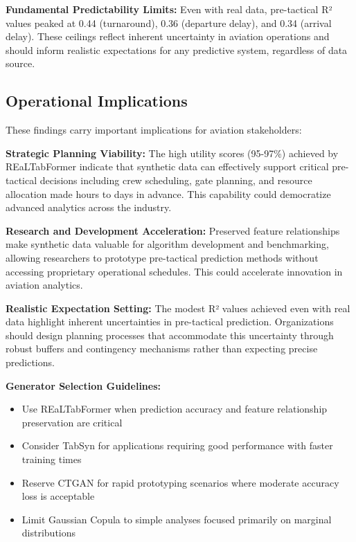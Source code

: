 \documentclass[conference]{IEEEtran}
\begin{document}
\textbf{Fundamental Predictability Limits:} Even with real data, pre-tactical R² values peaked at 0.44 (turnaround), 0.36 (departure delay), and 0.34 (arrival delay). These ceilings reflect inherent uncertainty in aviation operations and should inform realistic expectations for any predictive system, regardless of data source.

\subsection{Operational Implications}

These findings carry important implications for aviation stakeholders:

\textbf{Strategic Planning Viability:} The high utility scores (95-97\%) achieved by REaLTabFormer indicate that synthetic data can effectively support critical pre-tactical decisions including crew scheduling, gate planning, and resource allocation made hours to days in advance. This capability could democratize advanced analytics across the industry.

\textbf{Research and Development Acceleration:} Preserved feature relationships make synthetic data valuable for algorithm development and benchmarking, allowing researchers to prototype pre-tactical prediction methods without accessing proprietary operational schedules. This could accelerate innovation in aviation analytics.

\textbf{Realistic Expectation Setting:} The modest R² values achieved even with real data highlight inherent uncertainties in pre-tactical prediction. Organizations should design planning processes that accommodate this uncertainty through robust buffers and contingency mechanisms rather than expecting precise predictions.

\textbf{Generator Selection Guidelines:} 
\begin{itemize}
    \item Use REaLTabFormer when prediction accuracy and feature relationship preservation are critical
    \item Consider TabSyn for applications requiring good performance with faster training times
    \item Reserve CTGAN for rapid prototyping scenarios where moderate accuracy loss is acceptable
    \item Limit Gaussian Copula to simple analyses focused primarily on marginal distributions
\end{itemize}
\end{document}
